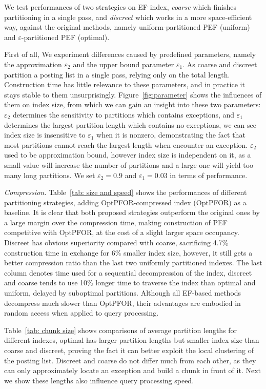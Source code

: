 \documentclass[runningheads,a4paper]{llncs}
\begin{document}
We test performances of two strategies on EF index, \textit{coarse} which finishes partitioning in a single pass, and \textit{discreet} which works in a more space-efficient way, against the original methods, namely uniform-partitioned PEF (uniform) and $\varepsilon$-partitioned PEF (optimal).

First of all, We experiment differences caused by predefined parameters, namely the approximation $\varepsilon_{2}$ and the upper bound parameter $\varepsilon_{1}$. As coarse and discreet partition a posting list in a single pass, relying only on the total length. Construction time has little relevance to these parameters, and in practice it stays stable to them unsurprisingly. Figure~\ref{fig:parameter} shows the influences of them on index size, from which we can gain an insight into these two parameters: $\varepsilon_{2}$ determines the sensitivity to partitions which contains exceptions, and $\varepsilon_{1}$ determines the largest partition length which contains no exceptions, we can see index size is insensitive to $\varepsilon_{1}$ when it is nonzero, demonstrating the fact that most partitions cannot reach the largest length when encounter an exception. $\varepsilon_{2}$ used to be approximation bound, however index size is independent on it, as a small value will increase the number of partitions and a large one will yield too many long partitions. We set $\varepsilon_{2}=0.9$ and $\varepsilon_{1}=0.03$ in terms of performance.

\textit{Compression.} Table~\ref{tab: size and speed} shows the performances of different partitioning strategies, adding OptPFOR-compressed index (OptPFOR) as a baseline. It is clear that both proposed strategies outperform the original ones by a large margin over the compression time, making construction of PEF competitive with OptPFOR, at the cost of a slight larger space occupancy. Discreet has obvious superiority compared with coarse, sacrificing 4.7\% construction time in exchange for 6\% smaller index size, however, it still gets a better compression ratio than the last two uniformly partitioned indexes. The last column denotes time used for a sequential decompression of the index, discreet and coarse tends to use 10\% longer time to traverse the index than optimal and uniform, delayed by suboptimal partitions. Although all EF-based methods decompress much slower than OptPFOR, their advantages are embodied in random access when applied to query processing.

Table~\ref{tab: chunk size} shows comparisons of average partition lengths for different indexes, optimal has larger partition lengths but smaller index size than coarse and discreet, proving the fact it can better exploit the local clustering of the posting list. Discreet and coarse do not differ much from each other, as they can only approximately locate an exception and build a chunk in front of it. Next we show these lengths also influence query processing speed.
\end{document}
